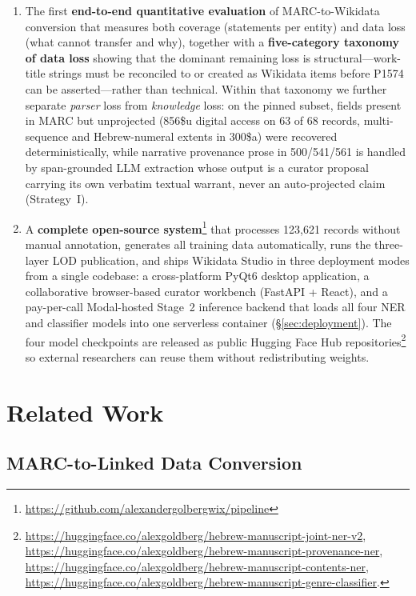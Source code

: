 \documentclass[Afour,sageh,times]{sagej}
\begin{document}
\begin{enumerate}[leftmargin=*]
\item The first \textbf{end-to-end quantitative evaluation} of MARC-to-Wikidata conversion that measures both coverage (statements per entity) and data loss (what cannot transfer and why), together with a \textbf{five-category taxonomy of data loss} showing that the dominant remaining loss is structural---work-title strings must be reconciled to or created as Wikidata items before P1574 can be asserted---rather than technical. Within that taxonomy we further separate \emph{parser} loss from \emph{knowledge} loss: on the pinned subset, fields present in MARC but unprojected (856\$u digital access on 63 of 68 records, multi-sequence and Hebrew-numeral extents in 300\$a) were recovered deterministically, while narrative provenance prose in 500/541/561 is handled by span-grounded LLM extraction whose output is a curator proposal carrying its own verbatim textual warrant, never an auto-projected claim (Strategy~I).
\item A \textbf{complete open-source system}\footnote{\url{https://github.com/alexandergolbergwix/pipeline}} that processes 123,621 records without manual annotation, generates all training data automatically, runs the three-layer LOD publication, and ships Wikidata Studio in three deployment modes from a single codebase: a cross-platform PyQt6 desktop application, a collaborative browser-based curator workbench (FastAPI + React), and a pay-per-call Modal-hosted Stage~2 inference backend that loads all four NER and classifier models into one serverless container (\S\ref{sec:deployment}). The four model checkpoints are released as public Hugging Face Hub repositories\footnote{\url{https://huggingface.co/alexgoldberg/hebrew-manuscript-joint-ner-v2}, \url{https://huggingface.co/alexgoldberg/hebrew-manuscript-provenance-ner}, \url{https://huggingface.co/alexgoldberg/hebrew-manuscript-contents-ner}, \url{https://huggingface.co/alexgoldberg/hebrew-manuscript-genre-classifier}.} so external researchers can reuse them without redistributing weights.
\end{enumerate}


\section{Related Work}
\label{sec:related}

\subsection{MARC-to-Linked Data Conversion}
\end{document}
